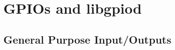 \chapter{GPIOs and libgpiod}
\section*{General Purpose Input/Outputs}

\alelogo

\minitoc

\clearpage



















